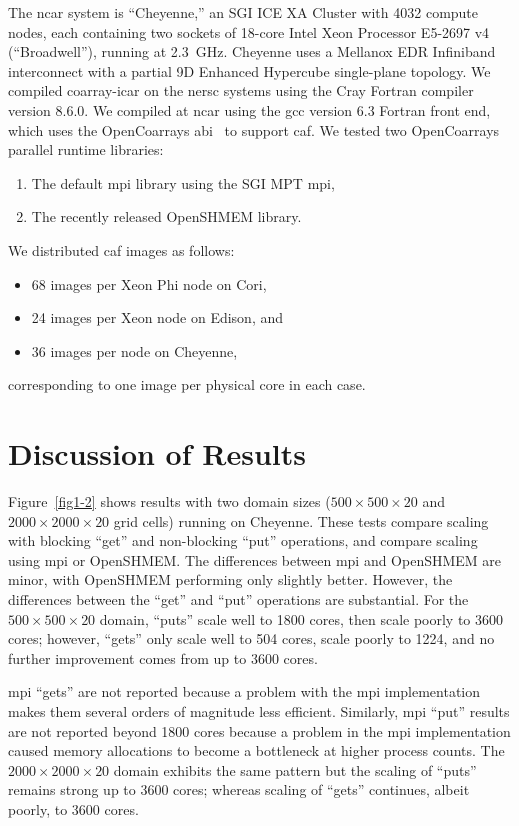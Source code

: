 The \gls{ncar} system is ``Cheyenne,'' an SGI ICE XA Cluster with \num{4032} compute nodes, each containing two sockets of 18-core Intel Xeon Processor E5-2697 v4 (``Broadwell''), running at \num{2.3}~\si{\giga\hertz}.
Cheyenne uses a Mellanox EDR Infiniband interconnect with a partial 9D Enhanced Hypercube single-plane topology.
We compiled coarray-\gls{icar} on the \gls{nersc} systems using the Cray Fortran compiler version 8.6.0.  We compiled
at \gls{ncar} using the \gls{gcc} version 6.3 Fortran front end, which uses the
OpenCoarrays \gls{abi}~\cite{fanfarillo2014opencoarrays} to support \gls{caf}.  We tested two OpenCoarrays parallel runtime libraries:
\begin{enumerate}
  \item The default \gls{mpi} library using the SGI MPT \gls{mpi},
  \item The recently released OpenSHMEM library.
\end{enumerate}
We distributed \gls{caf} images as follows:
\begin{itemize}
  \item 68 images per Xeon Phi node on Cori,
  \item 24 images per Xeon node on Edison, and
  \item 36 images per node on Cheyenne,
\end{itemize}
corresponding to one image per physical core in each case.

\section{Discussion of Results}
Figure~\ref{fig1-2} shows results with two domain sizes ($500 \times 500 \times 20$ and $2000 \times 2000 \times 20$ grid cells) running on Cheyenne.
These tests compare scaling with blocking ``get'' and non-blocking ``put'' operations, and compare scaling using \gls{mpi} or OpenSHMEM.
The differences between \gls{mpi} and OpenSHMEM are minor, with OpenSHMEM performing only slightly better.
However, the differences between the ``get'' and ``put'' operations are substantial.
For the $500 \times 500 \times 20$ domain, ``puts'' scale well to 1800 cores, then scale poorly to \num{3600} cores;
however, ``gets'' only scale well to \num{504} cores, scale poorly to \num{1224}, and no further improvement comes from up to \num{3600} cores.

\gls{mpi} ``gets'' are not reported because a problem with the \gls{mpi} implementation makes them several orders of magnitude less efficient.
Similarly, \gls{mpi} ``put'' results are not reported beyond \num{1800} cores because a problem in the \gls{mpi} implementation caused memory
allocations to become a bottleneck at higher process counts.
The $2000 \times 2000 \times 20$ domain exhibits the same pattern but the scaling of ``puts'' remains strong up to 3600 cores; whereas
scaling of ``gets'' continues, albeit poorly, to \num{3600} cores.

